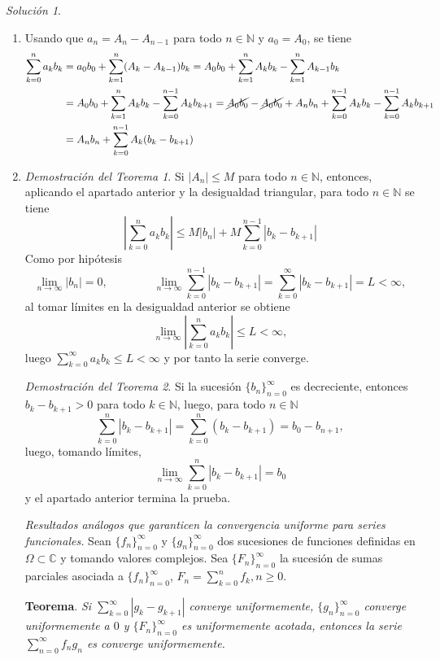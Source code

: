 \documentclass[11pt]{report}
\newcommand{\N}{\mathbb N}
\newcommand{\C}{\mathbb C}
\theoremstyle{remark}
\newtheorem*{resolution}{Solución}
\begin{document}
\begin{resolution}
\hfill
\begin{enumerate}
    \item Usando que $a_n = A_n-A_{n-1}$ para todo $n \in \N$ y $a_0=A_0$, se tiene 
    \[\begin{aligned}[t]
        \sum_{k=0}^na_kb_k&= a_0b_0+\sum_{k=1}^n(A_k-A_{k-1})b_k= A_0b_0+\sum_{k=1}^nA_kb_k-\sum_{k=1}^nA_{k-1}b_k \\
        &=A_0b_0+\sum_{k=1}^nA_kb_k-\sum_{k=0}^{n-1}A_{k}b_{k+1} =\cancel{A_0b_0}-\cancel{A_0b_0}+A_nb_n+\sum_{k=0}^{n-1}A_kb_k-\sum_{k=0}^{n-1}A_{k}b_{k+1} \\
        &=A_nb_n+\sum_{k=0}^{n-1}A_k(b_k-b_{k+1})
    \end{aligned}\]
    \item \textit{Demostración del Teorema 1}. Si $|A_n| \leq M$ para todo $n \in \N$, entonces, aplicando el apartado anterior y la desigualdad triangular, para todo $n \in \N$ se tiene
    \[\left|\sum_{k=0}^n a_kb_k\right| \leq M|b_n|+M\sum_{k=0}^{n-1}|b_k-b_{k+1}|\]
    Como por hipótesis
    \[\lim_{n \to \infty} |b_n| = 0, \qquad \qquad \lim_{n \to \infty} \sum_{k=0}^{n-1}|b_k-b_{k+1}| =\sum_{k=0}^\infty |b_k-b_{k+1}|=L< \infty,\] al tomar límites en la desigualdad anterior se obtiene
    \[\lim_{n \to \infty} \left|\sum_{k=0}^na_kb_k\right| \leq L < \infty,\]
    luego $\sum_{k=0}^\infty a_kb_k \leq L<\infty$ y por tanto la serie converge.

    \textit{Demostración del Teorema 2}. Si la sucesión $\{b_n\}_{n=0}^\infty$ es decreciente, entonces $b_k-b_{k+1}>0$ para todo $k \in \N$, luego, para todo $n \in \N$
    \[\sum_{k=0}^n |b_k-b_{k+1}| = \sum_{k=0}^n (b_k-b_{k+1}) = b_0-b_{n+1},\]
    luego, tomando límites, \[\lim_{n \to \infty} \sum_{k=0}^n |b_k-b_{k+1}| = b_0\]
    y el apartado anterior termina la prueba.

    \textit{Resultados análogos que garanticen la convergencia uniforme para series funcionales.} Sean $\{f_n\}_{n=0}^\infty$ y $\{g_n\}_{n=0}^\infty$ dos sucesiones de funciones definidas en $\Omega \subset \C$ y tomando valores complejos. Sea $\{F_n\}_{n=0}^\infty$ la sucesión de sumas parciales asociada a $\{f_n\}_{n= 0}^\infty$, $F_n = \sum_{k=0}^n f_k, n \geq 0$.

    \textbf{Teorema}. \textit{Si $\sum_{k=0}^\infty |g_k-g_{k+1}|$ converge uniformemente, $\{g_n\}_{n=0}^\infty$ converge uniformemente a $0$ y $\{F_n\}_{n=0}^\infty$ es uniformemente acotada, entonces la serie $\sum_{n=0}^\infty f_ng_n$ es converge uniformemente.}


\end{enumerate}
\end{resolution}
\end{document}
